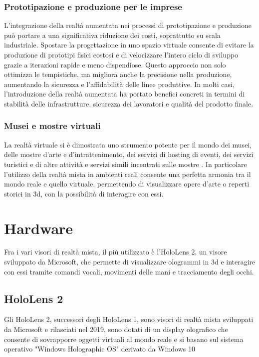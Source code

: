 \subsubsection{Prototipazione e produzione per le imprese}
L'integrazione della realtà aumentata nei processi di prototipazione e produzione può portare a una significativa riduzione dei costi, soprattutto su scala industriale. Spostare la progettazione in uno spazio virtuale consente di evitare la produzione di prototipi fisici costosi e di velocizzare l'intero ciclo di sviluppo grazie a iterazioni rapide e meno dispendiose. Questo approccio non solo ottimizza le tempistiche, ma migliora anche la precisione nella produzione, aumentando la sicurezza e l'affidabilità delle linee produttive. In molti casi, l'introduzione della realtà aumentata ha portato benefici concreti in termini di stabilità delle infrastrutture, sicurezza dei lavoratori e qualità del prodotto finale.\cite{MicrosoftPrototypingforEnterprises}

\subsubsection{Musei e mostre virtuali}
La realtà virtuale si è dimostrata uno strumento potente per il mondo dei musei, delle mostre d'arte e d'intrattenimento, dei servizi di hosting di eventi, dei servizi turistici e di altre attività e servizi simili incentrati sulle mostre \cite{MicrosoftVirtualMuseums}. In particolare l'utilizzo della realtà mista in ambienti reali consente una perfetta armonia tra il mondo reale e quello virtuale, permettendo di visualizzare opere d'arte o reperti storici in 3d, con la possibilità di interagire con essi. \cite{MixedRealityinMuseums}

\section{Hardware}
Fra i vari visori di realtà mista, il più utilizzato è l'HoloLens 2, un visore sviluppato da Microsoft, che permette di visualizzare ologrammi in 3d e interagire con essi tramite comandi vocali, movimenti delle mani e tracciamento degli occhi. 
\subsection{HoloLens 2}
Gli HoloLens 2, successori degli HoloLens 1, sono visori di realtà mista sviluppati da Microsoft e rilasciati nel 2019, sono dotati di un display olografico che consente di sovrapporre oggetti virtuali al mondo reale e si basano sul sistema operativo "Windows Holographic OS" derivato da Windows 10

